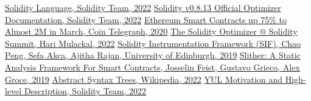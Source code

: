 
\begin{thebibliography}{9}
     \href{https://soliditylang.org/}{Solidity Language, Solidity Team, 2022}
     \href{https://docs.soliditylang.org/en/v0.8.13/internals/optimizer.html#optimizer-steps}{Solidity v0.8.13 Official Optimizer Documentation, Solidity Team, 2022}
     \href{https://cointelegraph.com/news/ethereum-smart-contracts-up-75-to-almost-2m-in-march}{Ethereum Smart Contracts up 75\% to Almost 2M in March, Coin Telegraph, 2020}
     \href{https://www.youtube.com/watch?v=BWO7ij9sLuA&ab_channel=SoliditySummit}{The Solidity Optimizer @ Solidity Summit, Hari Mulackal, 2022}
     \href{https://arxiv.org/pdf/1905.01659.pdf}{Solidity Instrumentation Framework (SIF), Chao Peng, Sefa Akca, Ajitha Rajan, University of Edinburgh, 2019}
     \href{https://arxiv.org/pdf/1908.09878.pdf}{Slither: A Static Analysis Framework For Smart Contracts, Josselin Feist, Gustavo Grieco, Alex Groce, 2019}
     \href{https://en.wikipedia.org/wiki/Abstract_syntax_tree}{Abstract Syntax Trees, Wikipedia, 2022}
     \href{https://docs.soliditylang.org/en/v0.8.14/yul.html#motivation-and-high-level-description}{YUL Motivation and High-level Description, Solidity Team, 2022}
\end{thebibliography}